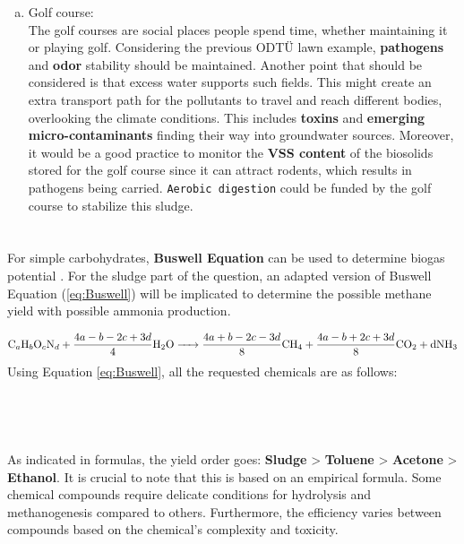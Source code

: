 \documentclass[a4paper]{article}
\begin{document}
\begin{enumerate}[a)]
    \item Golf course:\\
    The golf courses are social places people spend time, whether maintaining it or playing golf. Considering the previous ODTÜ lawn example, \textbf{pathogens} and \textbf{odor} stability should be maintained. Another point that should be considered is that excess water supports such fields. This might create an extra transport path for the pollutants to travel and reach different bodies, overlooking the climate conditions. This includes \textbf{toxins} and \textbf{emerging micro-contaminants} finding their way into groundwater sources. Moreover, it would be a good practice to monitor the \textbf{VSS content} of the biosolids stored for the golf course since it can attract rodents, which results in pathogens being carried\autocite{vesilind1988}. \texttt{Aerobic digestion} could be funded by the golf course to stabilize this sludge.
\end{enumerate}
\section{} %
\begin{minipage}[c]{0.5\textwidth}
For simple carbohydrates, \textbf{Buswell Equation} can be used to determine biogas potential \autocite{buswell1933}. For the sludge part of the question, an adapted version of Buswell Equation (\ref{eq:Buswell}) will be implicated to determine the possible methane yield with possible ammonia production\autocite{Angelidaki2004, sialve2009}.
\end{minipage}
\hfill
\begin{minipage}{0.4\textwidth}
\end{minipage}
\begin{equation}
    \ce{C_aH_bO_cN_d + $\frac{4a - b - 2c + 3d}{4}$H2O -> $\frac{4a + b - 2c - 3d}{8}$CH4 +  $\frac{4a - b + 2c + 3d}{8}$CO2 + dNH3}\label{eq:Buswell}
\end{equation}
Using Equation \ref{eq:Buswell}, all the requested chemicals are as follows:\\
\\
\\
\\
\\
As indicated in formulas, the yield order goes: \textbf{Sludge} > \textbf{Toluene} > \textbf{Acetone} > \textbf{Ethanol}. It is crucial to note that this is based on an empirical formula. Some chemical compounds require delicate conditions for hydrolysis and methanogenesis compared to others. Furthermore, the efficiency varies between compounds based on the chemical's complexity and toxicity\autocite{Edwards1994}.
\end{document}
